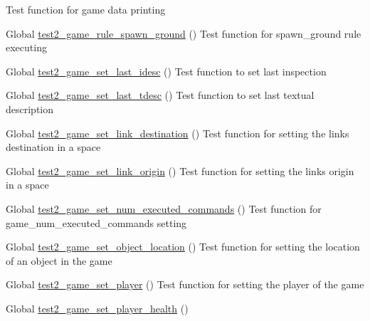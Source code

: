 \begin{DoxyRefList}
%
Test function for game data printing  
\item[Global \mbox{\hyperlink{game__test_8c_aaf50422ce5aa9a6772c23e91bac15154}{test2\+\_\+game\+\_\+rule\+\_\+spawn\+\_\+ground}} ()]\label{test__test000412}%
%
Test function for spawn\+\_\+ground rule executing  
\item[Global \mbox{\hyperlink{game__test_8c_aa8d16e306fb643342eb44b361eb90c5b}{test2\+\_\+game\+\_\+set\+\_\+last\+\_\+idesc}} ()]\label{test__test000285}%
%
Test function to set last inspection  
\item[Global \mbox{\hyperlink{game__test_8c_a367cfb59409aa89e9f32022b406bdc3d}{test2\+\_\+game\+\_\+set\+\_\+last\+\_\+tdesc}} ()]\label{test__test000281}%
%
Test function to set last textual description  
\item[Global \mbox{\hyperlink{game__test_8c_a8bc91954ffc24f0bbaf940cf9ccadbb8}{test2\+\_\+game\+\_\+set\+\_\+link\+\_\+destination}} ()]\label{test__test000250}%
%
Test function for setting the link\textquotesingle{}s destination in a space  
\item[Global \mbox{\hyperlink{game__test_8c_ad9dba63288aeb4c9e0176755c19ec604}{test2\+\_\+game\+\_\+set\+\_\+link\+\_\+origin}} ()]\label{test__test000244}%
%
Test function for setting the link\textquotesingle{}s origin in a space  
\item[Global \mbox{\hyperlink{game__test_8c_a86eaeba63667ab7bbe38cce97200efd4}{test2\+\_\+game\+\_\+set\+\_\+num\+\_\+executed\+\_\+commands}} ()]\label{test__test000277}%
%
Test function for game\+\_\+num\+\_\+executed\+\_\+commands setting  
\item[Global \mbox{\hyperlink{game__test_8c_a2bee8c4494438aa5cdc301ca6ef40e88}{test2\+\_\+game\+\_\+set\+\_\+object\+\_\+location}} ()]\label{test__test000207}%
%
Test function for setting the location of an object in the game  
\item[Global \mbox{\hyperlink{game__test_8c_ae89e8f87ae5b789482d40d3adf87f104}{test2\+\_\+game\+\_\+set\+\_\+player}} ()]\label{test__test000154}%
%
Test function for setting the player of the game  
\item[Global \mbox{\hyperlink{game__test_8c_a3b48f24cebbc93e2c4b29aa8f5db9a39}{test2\+\_\+game\+\_\+set\+\_\+player\+\_\+health}} ()]\label{test__test000168}%
%

\end{DoxyRefList}
